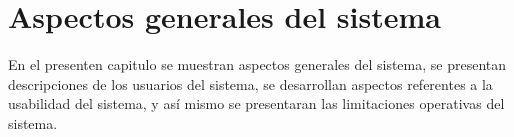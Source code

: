 \chapter{Aspectos generales del sistema}

En el presenten capitulo se muestran aspectos generales del sistema, se presentan descripciones de los usuarios del sistema, se desarrollan aspectos referentes a la usabilidad del sistema, y así mismo se presentaran las limitaciones operativas del sistema.





